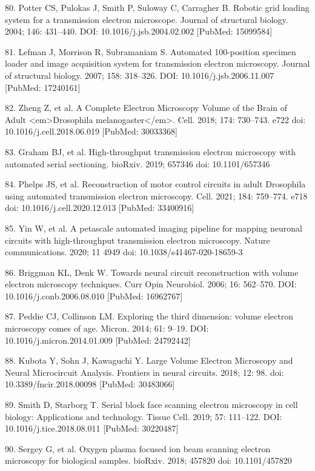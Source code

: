 \documentclass{article}
\begin{document}
\begin{hangpars}
80. Potter CS, Pulokas J, Smith P, Suloway C, Carragher B. Robotic grid loading system for a transmission electron microscope. Journal of structural biology. 2004; 146: 431–440. DOI: 10.1016/j.jsb.2004.02.002 [PubMed: 15099584]

81. Lefman J, Morrison R, Subramaniam S. Automated 100-position specimen loader and image acquisition system for transmission electron microscopy. Journal of structural biology. 2007; 158: 318–326. DOI: 10.1016/j.jsb.2006.11.007 [PubMed: 17240161]

82. Zheng Z, et al. A Complete Electron Microscopy Volume of the Brain of Adult <em>Drosophila melanogaster</em>. Cell. 2018; 174: 730–743. e722 doi: 10.1016/j.cell.2018.06.019 [PubMed: 30033368]

83. Graham BJ, et al. High-throughput transmission electron microscopy with automated serial sectioning. bioRxiv. 2019; 657346 doi: 10.1101/657346

84. Phelps JS, et al. Reconstruction of motor control circuits in adult Drosophila using automated transmission electron microscopy. Cell. 2021; 184: 759–774. e718 doi: 10.1016/j.cell.2020.12.013 [PubMed: 33400916]

85. Yin W, et al. A petascale automated imaging pipeline for mapping neuronal circuits with high-throughput transmission electron microscopy. Nature communications. 2020; 11 4949 doi: 10.1038/s41467-020-18659-3

86. Briggman KL, Denk W. Towards neural circuit reconstruction with volume electron microscopy techniques. Curr Opin Neurobiol. 2006; 16: 562–570. DOI: 10.1016/j.conb.2006.08.010 [PubMed: 16962767]

87. Peddie CJ, Collinson LM. Exploring the third dimension: volume electron microscopy comes of age. Micron. 2014; 61: 9–19. DOI: 10.1016/j.micron.2014.01.009 [PubMed: 24792442]

88. Kubota Y, Sohn J, Kawaguchi Y. Large Volume Electron Microscopy and Neural Microcircuit Analysis. Frontiers in neural circuits. 2018; 12: 98. doi: 10.3389/fncir.2018.00098 [PubMed: 30483066]

89. Smith D, Starborg T. Serial block face scanning electron microscopy in cell biology: Applications and technology. Tissue Cell. 2019; 57: 111–122. DOI: 10.1016/j.tice.2018.08.011 [PubMed: 30220487]

90. Sergey G, et al. Oxygen plasma focused ion beam scanning electron microscopy for biological samples. bioRxiv. 2018; 457820 doi: 10.1101/457820


\end{hangpars}
\end{document}
